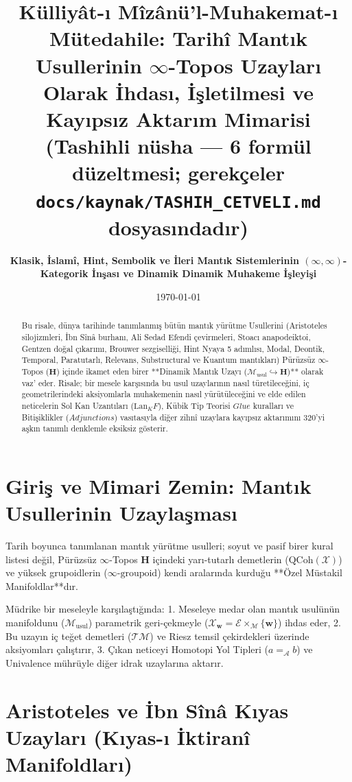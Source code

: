 \documentclass[11pt, a4paper]{article}
\title{\textbf{Külliyât-ı Mîzânü'l-Muhakemat-ı Mütedahile: Tarihî Mantık Usullerinin $\infty$-Topos Uzayları Olarak İhdası, İşletilmesi ve Kayıpsız Aktarım Mimarisi}\\ \normalsize\textmd{(Tashihli nüsha --- 6 formül düzeltmesi; gerekçeler \texttt{docs/kaynak/TASHIH\_CETVELI.md} dosyasındadır)}}
\author{\textbf{Klasik, İslamî, Hint, Sembolik ve İleri Mantık Sistemlerinin $(\infty, \infty)$-Kategorik İnşası ve Dinamik Dinamik Muhakeme İşleyişi}}
\date{\today}
\begin{document}
\maketitle

\begin{abstract}
Bu risale, dünya tarihinde tanımlanmış bütün mantık yürütme Usullerini (Aristoteles silojizmleri, İbn Sînâ burhanı, Ali Sedad Efendi çevirmeleri, Stoacı anapodeiktoi, Gentzen doğal çıkarımı, Brouwer sezgiselliği, Hint Nyaya 5 adımlısı, Modal, Deontik, Temporal, Paratutarlı, Relevans, Substructural ve Kuantum mantıkları) Pürüzsüz $\infty$-Topos ($\mathbf{H}$) içinde ikamet eden birer **Dinamik Mantık Uzayı ($\mathcal{M}_{\text{usul}} \hookrightarrow \mathbf{H}$)** olarak vaz' eder. Risale; bir mesele karşısında bu usul uzaylarının nasıl türetileceğini, iç geometrilerindeki aksiyomlarla muhakemenin nasıl yürütüleceğini ve elde edilen neticelerin Sol Kan Uzantıları ($\text{Lan}_K F$), Kübik Tip Teorisi $Glue$ kuralları ve Bitişiklikler ($Adjunctions$) vasıtasıyla diğer zihnî uzaylara kayıpsız aktarımını 320'yi aşkın tanımlı denklemle eksiksiz gösterir.
\end{abstract}

\tableofcontents
\newpage

\section{Giriş ve Mimari Zemin: Mantık Usullerinin Uzaylaşması}

Tarih boyunca tanımlanan mantık yürütme usulleri; soyut ve pasif birer kural listesi değil, Pürüzsüz $\infty$-Topos $\mathbf{H}$ içindeki yarı-tutarlı demetlerin ($\text{QCoh}(\mathcal{X})$) ve yüksek grupoidlerin ($\infty\text{-groupoid}$) kendi aralarında kurduğu **Özel Müstakil Manifoldlar**dır. 

Müdrike bir meseleyle karşılaştığında:
1. Meseleye medar olan mantık usulünün manifoldunu ($\mathcal{M}_{\text{usul}}$) parametrik geri-çekmeyle ($\mathcal{X}_{\mathbf{w}} = \mathcal{E} \times_{\mathcal{M}} \{\mathbf{w}\}$) ihdas eder,
2. Bu uzayın iç teğet demetleri ($\mathcal{T}\mathcal{M}$) ve Riesz temsil çekirdekleri üzerinde aksiyomları çalıştırır,
3. Çıkan neticeyi Homotopi Yol Tipleri ($a =_{\mathcal{A}} b$) ve Univalence mührüyle diğer idrak uzaylarına aktarır.

\section{Aristoteles ve İbn Sînâ Kıyas Uzayları (Kıyas-ı İktiranî Manifoldları)}
\end{document}
